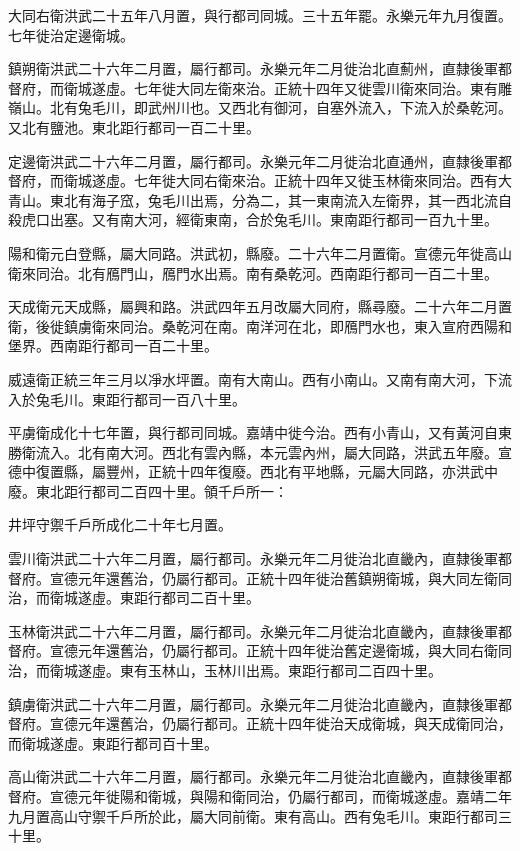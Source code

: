 大同右衛洪武二十五年八月置，與行都司同城。三十五年罷。永樂元年九月復置。七年徙治定邊衛城。

鎮朔衛洪武二十六年二月置，屬行都司。永樂元年二月徙治北直薊州，直隸後軍都督府，而衛城遂虛。七年徙大同左衛來治。正統十四年又徙雲川衛來同治。東有雕嶺山。北有兔毛川，即武州川也。又西北有御河，自塞外流入，下流入於桑乾河。又北有鹽池。東北距行都司一百二十里。

定邊衛洪武二十六年二月置，屬行都司。永樂元年二月徙治北直通州，直隸後軍都督府，而衛城遂虛。七年徙大同右衛來治。正統十四年又徙玉林衛來同治。西有大青山。東北有海子窊，兔毛川出焉，分為二，其一東南流入左衛界，其一西北流自殺虎口出塞。又有南大河，經衛東南，合於兔毛川。東南距行都司一百九十里。

陽和衛元白登縣，屬大同路。洪武初，縣廢。二十六年二月置衛。宣德元年徙高山衛來同治。北有鴈門山，鴈門水出焉。南有桑乾河。西南距行都司一百二十里。

天成衛元天成縣，屬興和路。洪武四年五月改屬大同府，縣尋廢。二十六年二月置衛，後徙鎮虜衛來同治。桑乾河在南。南洋河在北，即鴈門水也，東入宣府西陽和堡界。西南距行都司一百二十里。

威遠衛正統三年三月以凈水坪置。南有大南山。西有小南山。又南有南大河，下流入於兔毛川。東距行都司一百八十里。

平虜衛成化十七年置，與行都司同城。嘉靖中徙今治。西有小青山，又有黃河自東勝衛流入。北有南大河。西北有雲內縣，本元雲內州，屬大同路，洪武五年廢。宣德中復置縣，屬豐州，正統十四年復廢。西北有平地縣，元屬大同路，亦洪武中廢。東北距行都司二百四十里。領千戶所一：

井坪守禦千戶所成化二十年七月置。

雲川衛洪武二十六年二月置，屬行都司。永樂元年二月徙治北直畿內，直隸後軍都督府。宣德元年還舊治，仍屬行都司。正統十四年徙治舊鎮朔衛城，與大同左衛同治，而衛城遂虛。東距行都司二百十里。

玉林衛洪武二十六年二月置，屬行都司。永樂元年二月徙治北直畿內，直隸後軍都督府。宣德元年還舊治，仍屬行都司。正統十四年徙治舊定邊衛城，與大同右衛同治，而衛城遂虛。東有玉林山，玉林川出焉。東距行都司二百四十里。

鎮虜衛洪武二十六年二月置，屬行都司。永樂元年二月徙治北直畿內，直隸後軍都督府。宣德元年還舊治，仍屬行都司。正統十四年徙治天成衛城，與天成衛同治，而衛城遂虛。東距行都司百十里。

高山衛洪武二十六年二月置，屬行都司。永樂元年二月徙治北直畿內，直隸後軍都督府。宣德元年徙陽和衛城，與陽和衛同治，仍屬行都司，而衛城遂虛。嘉靖二年九月置高山守禦千戶所於此，屬大同前衛。東有高山。西有兔毛川。東距行都司三十里。

